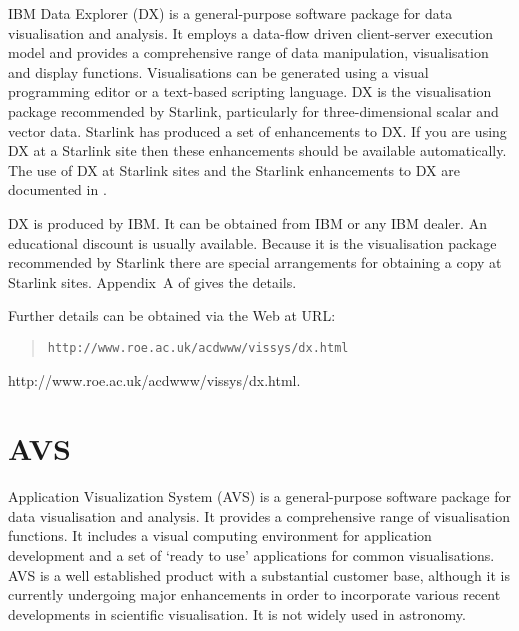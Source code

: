IBM Data Explorer (DX) is a general-purpose software package for data
visualisation and analysis. It employs a data-flow driven client-server
execution model and provides a comprehensive range of data manipulation,
visualisation and display functions. Visualisations can be generated
using a visual programming editor or a text-based scripting language.
DX is the visualisation package recommended by Starlink, particularly
for three-dimensional scalar and vector data. Starlink has produced a
set of enhancements to DX. If you are using DX at a Starlink site then
these enhancements should be available automatically. The use of DX at
Starlink sites and the Starlink enhancements to DX are documented in
\cite{SUN203}.

DX is produced by IBM. It can be obtained from IBM or any IBM dealer. 
An educational discount is usually available. Because it is the 
visualisation package recommended by Starlink there are special
arrangements for obtaining a copy at Starlink sites. Appendix~A of
\cite{SUN203} gives the details.

\begin{latexonly}
Further details can be obtained via the Web at URL:

\begin{quote}
{\tt http://www.roe.ac.uk/acdwww/vissys/dx.html}
\end{quote}
\end{latexonly}

\begin{htmlonly}
{http://www.roe.ac.uk/acdwww/vissys/dx.html}.
\end{htmlonly}


\section{AVS \label{AVS}  }

Application Visualization System (AVS) is a general-purpose software 
package for data visualisation and analysis. It provides a comprehensive
range of visualisation functions. It includes a visual computing
environment for application development and a set of `ready to use'
applications for common visualisations. AVS is a well established
product with a substantial customer base, although it is currently
undergoing major enhancements in order to incorporate various recent
developments in scientific visualisation. It is not widely used in
astronomy.

